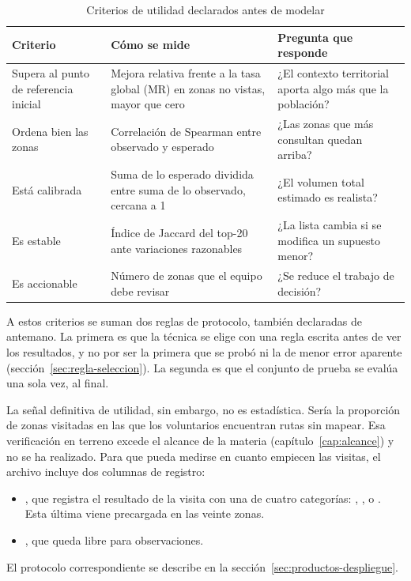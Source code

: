 \begin{table}[H]
  \centering
  \caption{Criterios de utilidad declarados antes de modelar}
  \label{tab:criterios-utilidad}
  \interlineadoSimple
  \small
  \begin{tabularx}{\textwidth}{@{}L{0.23\textwidth}L{0.33\textwidth}Y@{}}
    \toprule
    \textbf{Criterio} & \textbf{Cómo se mide} & \textbf{Pregunta que responde} \\
    \midrule
    Supera al punto de referencia inicial & Mejora relativa frente a la tasa global (MR) en zonas no vistas, mayor que cero & ¿El contexto territorial aporta algo más que la población? \\
    Ordena bien las zonas & Correlación de Spearman entre observado y esperado & ¿Las zonas que más consultan quedan arriba? \\
    Está calibrada & Suma de lo esperado dividida entre suma de lo observado, cercana a 1 & ¿El volumen total estimado es realista? \\
    Es estable & Índice de Jaccard del top-20 ante variaciones razonables & ¿La lista cambia si se modifica un supuesto menor? \\
    Es accionable & Número de zonas que el equipo debe revisar & ¿Se reduce el trabajo de decisión? \\
    \bottomrule
  \end{tabularx}
\end{table}

A estos criterios se suman dos reglas de protocolo, también declaradas de antemano. La
primera es que la técnica se elige con una regla escrita antes de ver los resultados, y no
por ser la primera que se probó ni la de menor error aparente
(sección~\ref{sec:regla-seleccion}). La segunda es que el conjunto de prueba se evalúa una
sola vez, al final.

La señal definitiva de utilidad, sin embargo, no es estadística. Sería la proporción de
zonas visitadas en las que los voluntarios encuentran rutas sin mapear. Esa verificación
en terreno excede el alcance de la materia (capítulo~\ref{cap:alcance}) y no se ha
realizado. Para que pueda medirse en cuanto empiecen las visitas, el archivo
 incluye dos columnas de registro:
\begin{itemize}
  \item {}, que registra el resultado de la visita con una de cuatro
        categorías: , , 
        o . Esta última viene precargada en las veinte zonas.
  \item {}, que queda libre para observaciones.
\end{itemize}
El protocolo correspondiente se describe en la sección~\ref{sec:productos-despliegue}.

